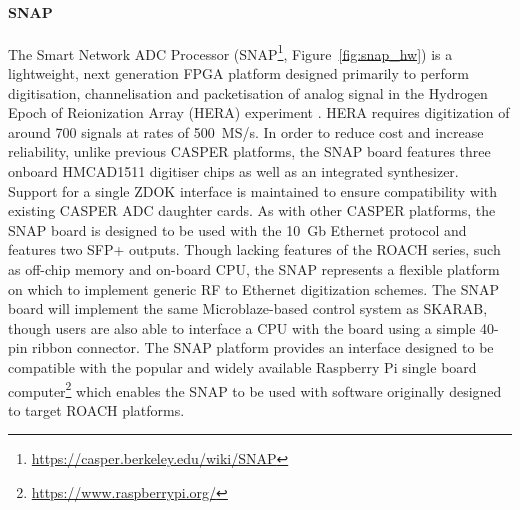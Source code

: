 \documentclass{ws-jai}
\begin{document}
\paragraph*{SNAP}
The Smart Network ADC Processor
(SNAP\footnote{\url{https://casper.berkeley.edu/wiki/SNAP}}, Figure~\ref{fig:snap_hw}) is a lightweight, next generation
FPGA platform designed primarily to perform digitisation, channelisation and packetisation of analog signal in the Hydrogen Epoch of
Reionization Array (HERA) experiment \citep{2016arXiv160607473D}. HERA requires digitization of around 700 signals at rates of 500~MS/s. In order to reduce cost and increase reliability, unlike previous CASPER platforms, the SNAP board features three onboard HMCAD1511 digitiser chips as well as an integrated synthesizer. Support for a single ZDOK interface is maintained to ensure compatibility with existing CASPER ADC daughter cards.
As with other CASPER platforms, the SNAP board is designed to be used with the 10~Gb Ethernet protocol and features two SFP+ outputs. Though lacking features of the ROACH series, such as off-chip memory and on-board CPU, the SNAP represents a flexible platform on which to implement generic RF to Ethernet digitization schemes.
The SNAP board will implement the same Microblaze-based control system as SKARAB, though users are also able to interface a CPU with the board using a simple 40-pin ribbon connector. The SNAP platform provides an interface designed to be compatible with the popular and widely available Raspberry Pi single board computer\footnote{\url{https://www.raspberrypi.org/}} which enables the SNAP to be used with software originally designed to target ROACH platforms.
% 
\end{document}

